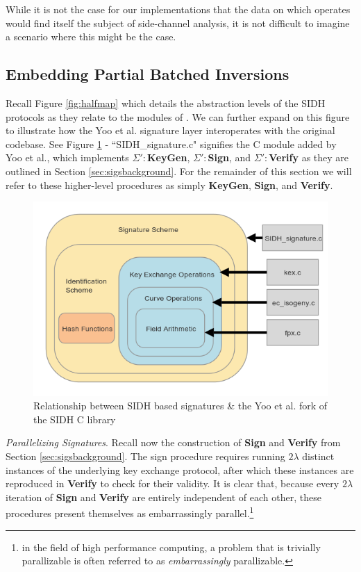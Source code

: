 While it is not the case for our implementations that the data on which  operates would find itself the subject of side-channel analysis, it is not difficult to imagine a scenario where this might be the case. 

\subsection{Embedding Partial Batched Inversions}

Recall Figure \ref{fig:halfmap} which details the abstraction levels of the SIDH protocols as they relate to the modules of \sidh. We can further expand on this figure to illustrate how the Yoo et al. signature layer interoperates with the original \sidh codebase. See Figure \ref{fig:fullmap} - ``SIDH\_signature.c" signifies the C module added by Yoo et al., which implements $\Sigma':$\textbf{KeyGen}, $\Sigma':$\textbf{Sign}, and $\Sigma':$\textbf{Verify} as they are outlined in Section \ref{sec:sigsbackground}. For the remainder of this section we will refer to these higher-level procedures as simply \textbf{KeyGen}, \textbf{Sign}, and \textbf{Verify}.

\begin{figure}[htp]
\centering
\includegraphics[scale=0.7]{fullmapwcurve.png} %
\caption{Relationship between SIDH based signatures \& the Yoo et al. fork of the SIDH C library}
\label{fig:fullmap} %
\end{figure}

\noindent
\emph{Parallelizing Signatures}. Recall now the construction of \textbf{Sign} and \textbf{Verify} from Section \ref{sec:sigsbackground}. The sign procedure requires running $2\lambda$ distinct instances of the underlying key exchange protocol, after which these instances are reproduced in \textbf{Verify} to check for their validity. It is clear that, because every $2\lambda$ iteration of \textbf{Sign} and \textbf{Verify} are entirely independent of each other, these procedures present themselves as embarrassingly parallel.\footnote{in the field of high performance computing, a problem that is trivially parallizable is often referred to as \emph{embarrassingly} parallizable.} 

